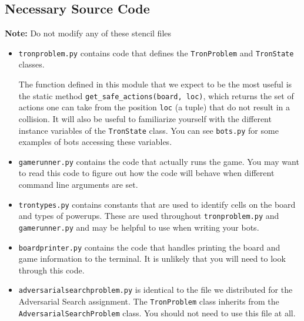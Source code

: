 \documentclass{article}
\begin{document}
    \subsection{Necessary Source Code}
    \hspace*{25pt}\textbf{Note:} Do not modify any of these stencil files
    \begin{itemize}
        \item \texttt{tronproblem.py} contains code that defines the \texttt{TronProblem} and \texttt{TronState} classes.

        The function defined in this module that we expect to be the most useful is the static method \texttt{get\_safe\_actions(board, loc)}, which returns the set of actions one can take from the position \texttt{loc} (a tuple) that do not result in a collision. It will also be useful to familiarize yourself with the different instance variables of the \texttt{TronState} class. You can see \texttt{bots.py} for some examples of bots accessing these variables.

        \item \texttt{gamerunner.py} contains the code that actually runs the game. You may want to read this code to figure out how the code will behave when different command line arguments are set.

        \item \texttt{trontypes.py} contains constants that are used to identify cells on the board and types of powerups. These are used throughout \texttt{tronproblem.py} and \texttt{gamerunner.py} and may be helpful to use when writing your bots.

        \item \texttt{boardprinter.py} contains the code that handles printing the board and game information to the terminal. It is unlikely that you will need to look through this code.

        \item \texttt{adversarialsearchproblem.py} is identical to the file we distributed for the Adversarial Search assignment. The \texttt{TronProblem} class inherits from the \texttt{AdversarialSearchProblem} class. You should not need to use this file at all.
    \end{itemize}
\end{document}
